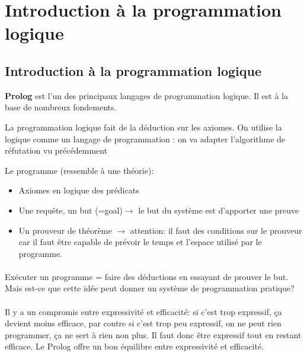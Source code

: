 \section{Introduction à la programmation logique}
\label{p2}
\subsection{Introduction à la programmation logique}

\textbf{Prolog} est l’un des principaux langages de programmation logique. Il est à la base de nombreux fondements. 

La programmation logique fait de la déduction sur les axiomes.
On utilise la logique comme un langage de programmation : on va adapter l’algorithme de réfutation vu précédemment

Le programme (ressemble à une théorie):
\begin{itemize}
	\item Axiomes en logique des prédicats
	\item Une requête, un but (=goal)$\rightarrow$ le but du système est d'apporter une preuve
	\item Un prouveur de théorème $\rightarrow$ attention: il faut des conditions sur le prouveur car il faut être capable de prévoir le temps et l’espace utilisé par le programme.
\end{itemize}

\paragraph{}
Exécuter un programme = faire des déductions en essayant de prouver le but. Mais est-ce que cette idée peut donner un système de programmation pratique?

\paragraph{}
Il y a un compromis entre expressivité et efficacité: si c’est trop expressif, ça devient moins efficace, par contre si c’est trop peu expressif, on ne peut rien programmer, ça ne sert à rien non plus. Il faut donc être expressif tout en restant efficace. Le Prolog offre un bon équilibre entre expressivité et efficacité.

